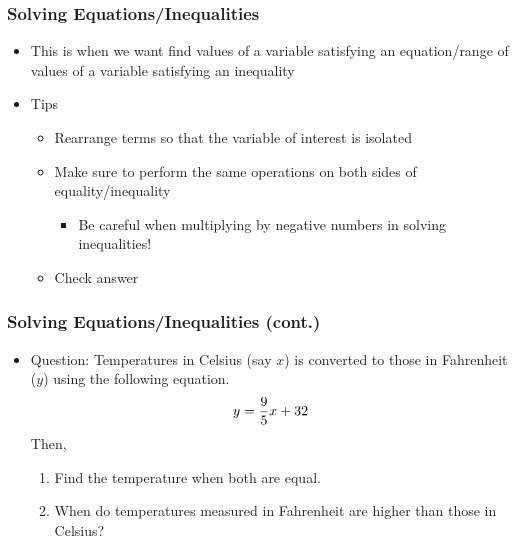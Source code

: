 \documentclass[pdflatex, 12pt]{beamer}
\begin{document}
\begin{frame}
\frametitle{Solving Equations/Inequalities}
\begin{itemize}
\item This is when we want find values of a variable satisfying an equation/range of values of a variable satisfying an inequality
\vspace{0.4cm}
\item Tips
 \begin{itemize}
 \item Rearrange terms so that the variable of interest is isolated
 \item Make sure to perform the same operations on both sides of equality/inequality
  \begin{itemize}
  \item Be careful when multiplying by negative numbers in solving inequalities!
  \end{itemize}
 \item Check answer
 \end{itemize}
\end{itemize}
\end{frame}

\begin{frame}
\frametitle{Solving Equations/Inequalities (cont.)}
\begin{itemize}
\item Question: Temperatures in Celsius (say $x$) is converted to those in Fahrenheit ($y$) using the following equation.
 \begin{equation}
 y = \frac{9}{5}x + 32 \notag
 \end{equation} 
Then,
 \begin{enumerate}
 \item Find the temperature when both are equal.
 \item When do temperatures measured in Fahrenheit are higher than those in Celsius?
 \end{enumerate}
\end{itemize}
\end{frame}
\end{document}
